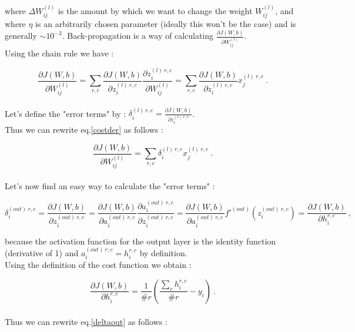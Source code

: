 \documentclass[a4paper,12pt,twoside]{article}
\begin{document}
where $\Delta W_{ij}^{(l)}$ is the amount by which we want to change the weight $W_{ij}^{(l)}$, and where $\eta$ is an arbitrarily chosen parameter (ideally this won't be the case) and is generally $\sim 10^{-3}$. Back-propagation is a way of calculating $\frac{\partial J(W,b)}{\partial W_{ij}^{(l)}}$.\\
Using the chain rule we have :

\begin{equation}
\frac{\partial J(W,b)}{\partial W^{(l)}_{ij}} =\sum_{r,c} \frac{\partial J(W,b)}{\partial z^{(l)~r,c}_{i}} \frac{\partial z^{(l)~r,c}_{i}}{\partial W^{(l)}_{ij}} = \sum_{r,c} \frac{\partial J(W,b)}{\partial z^{(l)~r,c}_{i}}x_j^{(l)~r,c}~.
\label{costder}
\end{equation}
\\
Let's define the "error terms" by : $\delta^{(l)~r,c}_i = \frac{\partial J(W,b)}{\partial z^{(l)~r,c}_i}$. \\
Thus we can rewrite eq.\ref{costder} as follows :

\begin{equation}
\frac{\partial J(W,b)}{\partial W^{(l)}_{ij}} =\sum_{r,c} \delta^{(l)~r,c}_i x_j^{(l)~r,c}~.
\end{equation}
\\
Let's now find an easy way to calculate the "error terms" : 

\begin{equation}
\delta^{(out)~r,c}_i  = \frac{\partial J(W,b)}{\partial z^{(out)~r,c}_i} = \frac{\partial J(W,b)}{\partial a^{(out)~r,c}_i} \frac{\partial a^{(out)~r,c}_i}{\partial z^{(out)~r,c}_i} = \frac{\partial J(W,b)}{\partial a^{(out)~r,c}_i} f'^{(out)}(z^{(out)~r,c}_i) = \frac{\partial J(W,b)}{\partial h^{r,c}_i}~,
\label{deltaout}
\end{equation}

because the activation function for the output layer is the identity function (derivative of 1) and $a^{(out)~r,c}_i = h^{r,c}_i$ by definition.\\
Using the definition of the cost function we obtain : 

\begin{equation}
\frac{\partial J(W,b)}{\partial h^{r,c}_i}  = \frac{1}{\# r}\left(\frac{\sum_r h_i^{r,c}}{\# r} - y_i \right)~.
\end{equation}
 \\

Thus we can rewrite eq.\ref{deltaout} as follows : 
\end{document}
